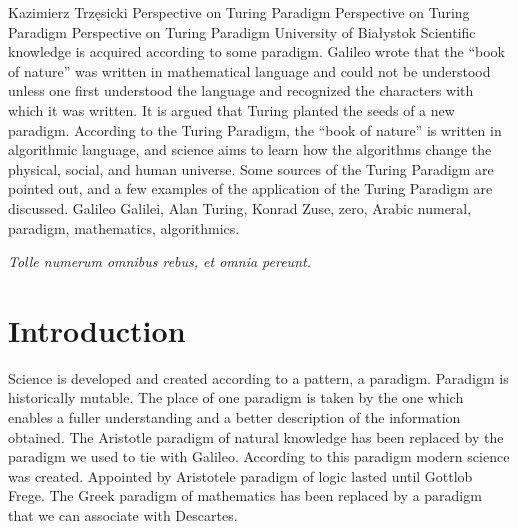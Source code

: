 \begin{artengenv}{Kazimierz Trzęsicki}
	{Perspective on Turing Paradigm}
	{Perspective on Turing Paradigm}
	{Perspective on Turing Paradigm}
	{University of Białystok}
	{Scientific knowledge is acquired according to some paradigm. Galileo wrote that the ``book of nature'' was written in mathematical language and could not be understood unless one first understood the language and recognized the characters with which it was written. It is argued that Turing planted the seeds of a new paradigm. According to the Turing Paradigm, the ``book of nature'' is written in algorithmic language, and science aims to learn how the algorithms change the physical, social, and human universe. Some sources of the Turing Paradigm are pointed out, and a few examples of the application of the Turing Paradigm are discussed.
	}
	{Galileo Galilei, Alan Turing, Konrad Zuse, zero, Arabic numeral, paradigm, mathematics, algorithmics.}

 
  
\epigraph{{\footnotesize \textit{Tolle numerum omnibus rebus, et omnia pereunt.} }}{
{\footnotesize
\begin{flushleft}
\parencite[Liber III, \textit{De mathematica}, IV. \textit{Quid praestent numeri}]{Izydor1911}
\end{flushleft}
}\hfill \phantom{}}


\section{Introduction}

\lettrine[loversize=0.13,lines=2,lraise=-0.03,nindent=0em,findent=0.2pt]%
{S}{}cience is developed and created  according to a pattern, a paradigm. Paradigm is historically mutable. The place of one paradigm is taken by the one which enables a fuller understanding and a better description of the information obtained. The Aristotle paradigm of natural knowledge has been replaced by the paradigm  we used to tie with Galileo. According to this paradigm modern science was created. Appointed by Aristotele paradigm of logic lasted until Gottlob Frege. The Greek paradigm of mathematics has been replaced by a paradigm that we can associate with Descartes.


\end{artengenv}

